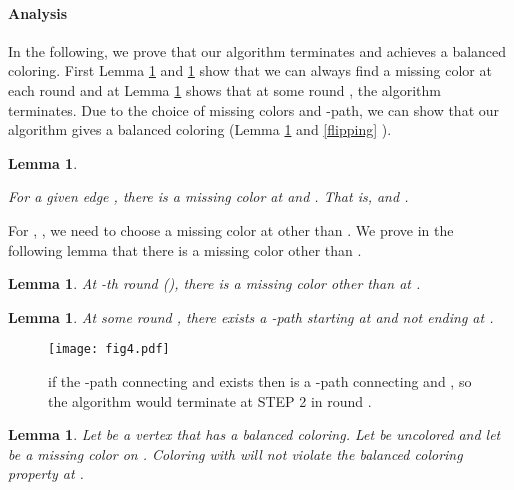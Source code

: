 \documentclass[titlepage, 11pt]{article}
\newtheorem{lemma}[theorem]{Lemma}
\begin{document}
\paragraph{Analysis} In the following, we prove that our algorithm terminates and achieves 
a balanced coloring. First Lemma \ref{saturated} and \ref{lemma:saturated2} show that we can always find a missing color at each round and at Lemma \ref{termin} shows that at some round ,
the algorithm terminates. Due to the choice of missing colors and -path,
we can show that our algorithm gives a balanced coloring (Lemma \ref{missing} and \ref{flipping} ).

\begin{lemma}\label{saturated}
\iffalse
For vertex  with , if  has a balanced coloring and an uncolored adjacent edge  then there must be a very weak color class in .
For vertex  with , has a balanced coloring then there must be a very weak color class at .
\fi
For a given edge , there is a missing color at  and .
That is,  and  .
\end{lemma}

For , ,  we need to choose a missing color at  other than . We prove in the following lemma
that there is a missing color other than . 
\begin{lemma}\label{lemma:saturated2}
At -th round (), there is a missing color other than  at . 
\end{lemma}

\begin{lemma}\label{termin}
At some round , there exists a -path starting at  and not ending at .
\end{lemma}

\begin{figure}[ht]      
\begin{center}        
  \begin{center}
    \centerline{\texttt{[image: fig4.pdf]}}
    \caption{if the -path  connecting  and  exists then  is a -path connecting  and , so the algorithm would terminate at STEP 2 in round .
\label{fig:lemma12}}
  \end{center}
\end{center}
\end{figure}

\begin{lemma}\label{missing}
Let  be a vertex that has a balanced coloring. Let  be uncolored and let  be a missing color on . Coloring  with  will not violate the balanced coloring property at . 
\end{lemma}
\end{document}
